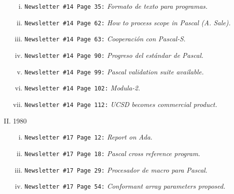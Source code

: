 \begin{enumerate}[I.]
\begin{enumerate}[i.]
\item \texttt{Newsletter \#14 Page 35:} \textit{Formato de texto para programas.}

\item \texttt{Newsletter \#14 Page 62:} \textit{How to process scope in Pascal (A. Sale).}

\item \texttt{Newsletter \#14 Page 63:} \textit{Cooperación con Pascal-S.}

\item \texttt{Newsletter \#14 Page 90:} \textit{Progreso del estándar de Pascal.}

\item \texttt{Newsletter \#14 Page 99:} \textit{Pascal validation suite available.}

\item \texttt{Newsletter \#14 Page 102:} \textit{Modula-2.}

\item \texttt{Newsletter \#14 Page 112:} \textit{UCSD becomes commercial product.}

\end{enumerate}

\item 1980

\begin{enumerate}[i.]

\item \texttt{Newsletter \#17 Page 12:} \textit{Report on Ada.}

\item \texttt{Newsletter \#17 Page 18:} \textit{Pascal cross reference program.}

\item \texttt{Newsletter \#17 Page 29:} \textit{Procesador de macro para Pascal.}

\item \texttt{Newsletter \#17 Page 54:} \textit{Conformant array parameters proposed.}

\end{enumerate}

\end{enumerate}